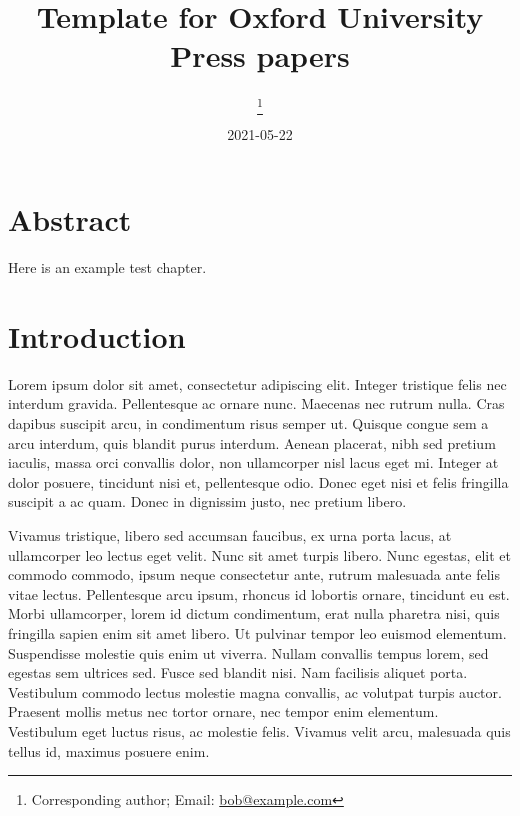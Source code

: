 \documentclass[12pt,halfline,a4paper,]{ouparticle}
\begin{document}
\title{Template for Oxford University Press papers}

\author{%
\address{Some Institute of Technology}
\and
{}\address{Another University}\thanks{Corresponding author; Email: \href{mailto:bob@example.com}{bob@example.com}}
\and
{}\address{Another University}
\and
{}\address{Some Institute of Technology}
}


\date{2021-05-22}


\maketitle



\hypertarget{abstract}{%
\section{Abstract}\label{abstract}}

Here is an example test chapter.

\hypertarget{introduction}{%
\section{Introduction}\label{introduction}}

Lorem ipsum dolor sit amet, consectetur adipiscing elit. Integer tristique felis nec
interdum gravida. Pellentesque ac ornare nunc. Maecenas nec rutrum nulla. Cras dapibus
suscipit arcu, in condimentum risus semper ut. Quisque congue sem a arcu interdum, quis
blandit purus interdum. Aenean placerat, nibh sed pretium iaculis, massa orci convallis
dolor, non ullamcorper nisl lacus eget mi. Integer at dolor posuere, tincidunt nisi et,
pellentesque odio. Donec eget nisi et felis fringilla suscipit a ac quam. Donec in
dignissim justo, nec pretium libero.

Vivamus tristique, libero sed accumsan faucibus, ex urna porta lacus, at ullamcorper leo
lectus eget velit. Nunc sit amet turpis libero. Nunc egestas, elit et commodo commodo,
ipsum neque consectetur ante, rutrum malesuada ante felis vitae lectus. Pellentesque arcu
ipsum, rhoncus id lobortis ornare, tincidunt eu est. Morbi ullamcorper, lorem id dictum
condimentum, erat nulla pharetra nisi, quis fringilla sapien enim sit amet libero. Ut
pulvinar tempor leo euismod elementum. Suspendisse molestie quis enim ut viverra. Nullam
convallis tempus lorem, sed egestas sem ultrices sed. Fusce sed blandit nisi. Nam
facilisis aliquet porta. Vestibulum commodo lectus molestie magna convallis, ac volutpat
turpis auctor. Praesent mollis metus nec tortor ornare, nec tempor enim elementum.
Vestibulum eget luctus risus, ac molestie felis. Vivamus velit arcu, malesuada quis tellus
id, maximus posuere enim.
\end{document}
